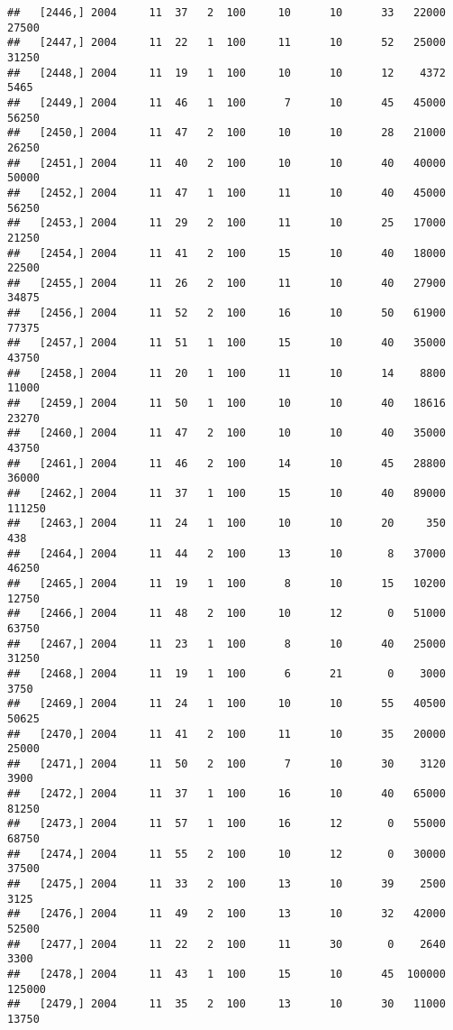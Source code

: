 \documentclass{article}\usepackage[]{graphicx}\usepackage[]{color}
\makeatletter
\newenvironment{kframe}{%
 \def\at@end@of@kframe{}%
 \ifinner\ifhmode%
  \def\at@end@of@kframe{\end{minipage}}%
  \begin{minipage}{\columnwidth}%
 \fi\fi%
 \def\FrameCommand##1{\hskip\@totalleftmargin \hskip-\fboxsep
 \colorbox{shadecolor}{##1}\hskip-\fboxsep
     \hskip-\linewidth \hskip-\@totalleftmargin \hskip\columnwidth}%
 \MakeFramed {\advance\hsize-\width
   \@totalleftmargin\z@ \linewidth\hsize
   \@setminipage}}%
 {\par\unskip\endMakeFramed%
 \at@end@of@kframe}
\newenvironment{knitrout}{}{} %
\makeatother
\begin{document}
\begin{knitrout}
\begin{kframe}
\begin{verbatim}
##   [2446,] 2004     11  37   2  100     10      10      33   22000   27500
##   [2447,] 2004     11  22   1  100     11      10      52   25000   31250
##   [2448,] 2004     11  19   1  100     10      10      12    4372    5465
##   [2449,] 2004     11  46   1  100      7      10      45   45000   56250
##   [2450,] 2004     11  47   2  100     10      10      28   21000   26250
##   [2451,] 2004     11  40   2  100     10      10      40   40000   50000
##   [2452,] 2004     11  47   1  100     11      10      40   45000   56250
##   [2453,] 2004     11  29   2  100     11      10      25   17000   21250
##   [2454,] 2004     11  41   2  100     15      10      40   18000   22500
##   [2455,] 2004     11  26   2  100     11      10      40   27900   34875
##   [2456,] 2004     11  52   2  100     16      10      50   61900   77375
##   [2457,] 2004     11  51   1  100     15      10      40   35000   43750
##   [2458,] 2004     11  20   1  100     11      10      14    8800   11000
##   [2459,] 2004     11  50   1  100     10      10      40   18616   23270
##   [2460,] 2004     11  47   2  100     10      10      40   35000   43750
##   [2461,] 2004     11  46   2  100     14      10      45   28800   36000
##   [2462,] 2004     11  37   1  100     15      10      40   89000  111250
##   [2463,] 2004     11  24   1  100     10      10      20     350     438
##   [2464,] 2004     11  44   2  100     13      10       8   37000   46250
##   [2465,] 2004     11  19   1  100      8      10      15   10200   12750
##   [2466,] 2004     11  48   2  100     10      12       0   51000   63750
##   [2467,] 2004     11  23   1  100      8      10      40   25000   31250
##   [2468,] 2004     11  19   1  100      6      21       0    3000    3750
##   [2469,] 2004     11  24   1  100     10      10      55   40500   50625
##   [2470,] 2004     11  41   2  100     11      10      35   20000   25000
##   [2471,] 2004     11  50   2  100      7      10      30    3120    3900
##   [2472,] 2004     11  37   1  100     16      10      40   65000   81250
##   [2473,] 2004     11  57   1  100     16      12       0   55000   68750
##   [2474,] 2004     11  55   2  100     10      12       0   30000   37500
##   [2475,] 2004     11  33   2  100     13      10      39    2500    3125
##   [2476,] 2004     11  49   2  100     13      10      32   42000   52500
##   [2477,] 2004     11  22   2  100     11      30       0    2640    3300
##   [2478,] 2004     11  43   1  100     15      10      45  100000  125000
##   [2479,] 2004     11  35   2  100     13      10      30   11000   13750

\end{verbatim}
\end{kframe}
\end{knitrout}
\end{document}
